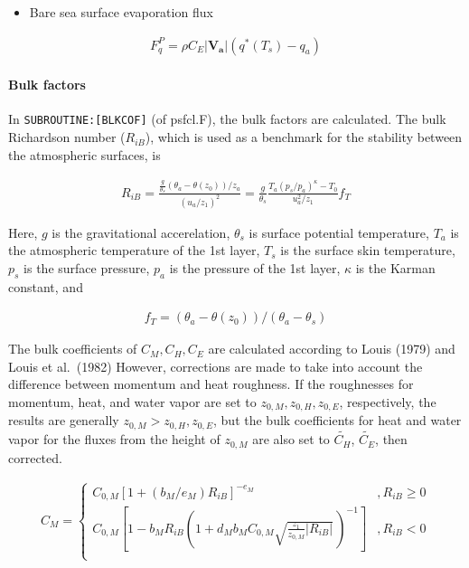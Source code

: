\begin{itemize}
\tightlist
\item
  Bare sea surface evaporation flux
\end{itemize}

\begin{eqnarray}
    F_q^P = \rho C_E |\mathbf{V_a}| \left( q^{\ast}(T_s) - q_a \right)
\end{eqnarray}

\hypertarget{bulk-factors}{%
\paragraph{Bulk factors}\label{bulk-factors}}

In \texttt{SUBROUTINE:{[}BLKCOF{]}} (of psfcl.F), the bulk factors are
calculated. The bulk Richardson number (\(R_{iB}\)), which is used as a
benchmark for the stability between the atmospheric surfaces, is

\begin{eqnarray}
R_{iB} =
            \frac{ \frac{g}{\theta_s} (\theta_a - \theta(z_0))/z_a }
              { (u_a/z_1)^2                                  }
       = \frac{g}{\theta_s}
         \frac{T_a (p_s/p_a)^\kappa - T_0 }{u_a^2/z_1} f_T
\end{eqnarray}

Here, \(g\) is the gravitational accerelation, \(\theta_s\) is surface
potential temperature, \(T_a\) is the atmospheric temperature of the 1st
layer, \(T_s\) is the surface skin temperature, \(p_s\) is the surface
pressure, \(p_a\) is the pressure of the 1st layer, \(\kappa\) is the
Karman constant, and

\begin{eqnarray}
f_T = (\theta_a - \theta(z_0))/(\theta_a - \theta_s)
\end{eqnarray}

The bulk coefficients of \(C_M,C_H,C_E\) are calculated according to
Louis (1979) and Louis et al.~(1982) However, corrections are made to
take into account the difference between momentum and heat roughness. If
the roughnesses for momentum, heat, and water vapor are set to
\(z_{0,M}, z_{0,H}, z_{0,E}\), respectively, the results are generally
\(z_{0,M} > z_{0,H}, z_{0,E}\), but the bulk coefficients for heat and
water vapor for the fluxes from the height of \(z_{0,M}\) are also set
to \(\widetilde{C_H}\), \(\widetilde{C_E}\), then corrected.

\begin{eqnarray}
    C_M = \left\{
      \begin{array}{lr}
      C_{0,M} [ 1 + (b_M/e_M)  R_{iB} ]^{-e_M}
            &,
          R_{iB} \geq 0 \\
      C_{0,M} \left[ 1 - b_M R_{iB} \left( 1+ d_M b_M C_{0,M}
                                  \sqrt{\frac{z_1}{z_{0,M}}| R_{iB}|} \,
                                  \right)^{-1} \right]     
          &,
          R_{iB} < 0 \\
      \end{array} \right.
\end{eqnarray}

